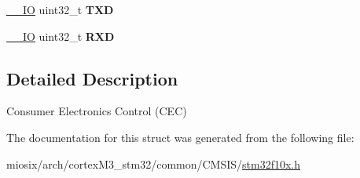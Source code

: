 \begin{DoxyCompactItemize}
\item 
\hypertarget{struct_c_e_c___type_def_a462a952588fc45732d4545dbe79356da}{\hyperlink{group___c_m_s_i_s__core__definitions_gaec43007d9998a0a0e01faede4133d6be}{\-\_\-\-\_\-\-I\-O} uint32\-\_\-t {\bfseries T\-X\-D}}\label{struct_c_e_c___type_def_a462a952588fc45732d4545dbe79356da}

\item 
\hypertarget{struct_c_e_c___type_def_a13d5b0e5228d5cca9f7c5d8533705d21}{\hyperlink{group___c_m_s_i_s__core__definitions_gaec43007d9998a0a0e01faede4133d6be}{\-\_\-\-\_\-\-I\-O} uint32\-\_\-t {\bfseries R\-X\-D}}\label{struct_c_e_c___type_def_a13d5b0e5228d5cca9f7c5d8533705d21}

\end{DoxyCompactItemize}


\subsection{Detailed Description}
Consumer Electronics Control (C\-E\-C) 

The documentation for this struct was generated from the following file\-:\begin{DoxyCompactItemize}
\item 
miosix/arch/cortex\-M3\-\_\-stm32/common/\-C\-M\-S\-I\-S/\hyperlink{stm32f10x_8h}{stm32f10x.\-h}\end{DoxyCompactItemize}
